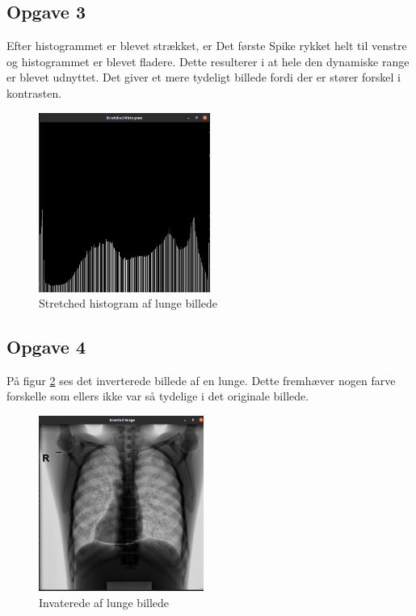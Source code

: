\documentclass{article}
\begin{document}
\subsection{Opgave 3}
Efter histogrammet er blevet strækket, er Det første Spike rykket helt til venstre og histogrammet er blevet fladere. Dette resulterer i at hele den dynamiske range er blevet udnyttet. Det giver et mere tydeligt billede fordi der er stører forskel i kontrasten.   

\begin{figure}[H]
     \begin{center}
        \includegraphics[width=0.5\textwidth]{Image/StrechedHistogram.png}
        \caption{Stretched histogram af lunge billede}
    \end{center}
    \label{fig:f3}
\end{figure}

\subsection{Opgave 4}
På figur \ref{fig:f4} ses det inverterede billede af en lunge. Dette fremhæver nogen farve forskelle som ellers ikke var så tydelige i det originale billede.  
\begin{figure}[H] 
  \begin{center}
    \includegraphics[width=0.48\textwidth]{Image/InvertedImage.png}
  \end{center}
  \caption{Invaterede af lunge billede}
  \label{fig:f4}
\end{figure}
\end{document}
